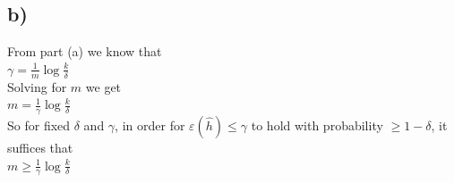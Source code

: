 \documentclass[11pt]{article}
\begin{document}
\subsection*{b)}
From part (a) we know that \\
$\gamma = \frac{1}{m} \log \frac{k}{\delta}$ \\

Solving for $m$ we get \\
$m = \frac{1}{\gamma} \log \frac{k}{\delta}$ \\

So for fixed $\delta$ and $\gamma$, in order for $\varepsilon(\hat{h}) \le \gamma$ to hold with probability $\ge 1 - \delta$, it suffices that \\
$m \ge \frac{1}{\gamma} \log \frac{k}{\delta}$ \\
\end{document}

